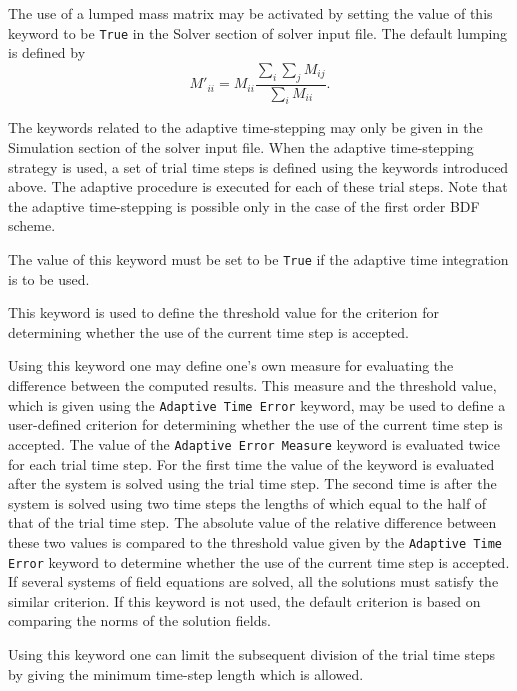 The use of a lumped mass matrix may be activated by setting the value of this 
keyword to be {\tt True} in the Solver section of solver input file. 
The default lumping is defined by
\begin{equation}
M'_{ii} = M_{ii}\frac{\sum_i\sum_j M_{ij}}{\sum_i M_{ii}}.
\end{equation}
\sifend

\noindent
The keywords related to the adaptive time-stepping may only be given in the Simulation section
of the solver input file. When the adaptive time-stepping strategy is used, a set of trial 
time steps is defined using the keywords introduced above. 
The adaptive procedure is executed for each of these trial steps. Note that
the adaptive time-stepping is possible only in the case of the first order BDF scheme.

\sifbegin
{}
The value of this keyword must be set to be {\tt True} if 
the adaptive time integration is to be used.

This keyword is used to define the threshold value for the criterion for
determining whether the use of the current time step is accepted.

Using this keyword one may define one's own measure for evaluating the difference
between the computed results. This measure and the threshold value, which is
given using the {\tt Adaptive Time Error} keyword, may be used to define  
a user-defined criterion for determining whether the use of the current time step is 
accepted. The value of the {\tt Adaptive Error Measure}
keyword is evaluated twice for each trial time step. 
For the first time the value
of the keyword is evaluated after the system is solved using the trial time step. 
The second time is after the system is solved using two time steps the lengths of 
which equal to the half of that of the trial time step.
The absolute value of the relative difference between these two values
is compared to the threshold value given by the {\tt Adaptive Time Error} keyword
to determine whether the use of the current time step is 
accepted. If several systems of field equations are solved, all the solutions must
satisfy the similar criterion.
If this keyword is not used, the default criterion is based on comparing 
the norms of the solution fields. 

Using this keyword one can limit the subsequent division of the trial time steps 
by giving the minimum time-step length which is allowed.

